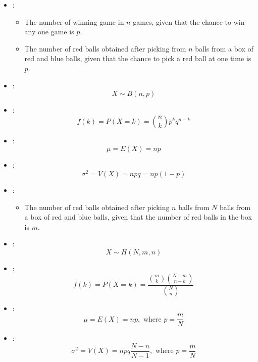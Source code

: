 \begin{multicols}{3}


    \begin{itemize}
      \item {}:
        \begin{itemize}
          \item The number of winning game in $n$ games, given that the chance to win any one game is $p$.
          \item The number of red balls obtained after picking  from $n$ balls from a box of red and blue balls, given that the chance to pick a red ball at one time is $p$.
        \end{itemize}
      \item {}:
        \[
          X \sim B(n, p)
        \]
      \item {}:
        \[
          f(k) = P(X = k) = {n \choose k} p^k q^{n - k}
        \]
      \item {}:
        \[
          \mu = E(X) = np
        \]
      \item {}:
        \[
          \sigma^2 = V(X) = npq = np(1 - p)
        \]
    \end{itemize}

    \begin{itemize}
      \item {}:
        \begin{itemize}
          \item The number of red balls obtained after picking  $n$ balls from $N$ balls from a box of red and blue balls, given that the number of red balls in the box is $m$.
        \end{itemize}
      \item {}:
        \[
          X \sim H(N, m, n)
        \]
      \item {}:
        \[
          f(k) = P(X = k) = \dfrac{{m \choose k} {N - m \choose n - k}}{{N \choose n}}
        \]
      \item {}:
        \[
          \mu = E(X) = np, \text{ where } p = \frac{m}{N}
        \]
      \item {}:
        \[
          \sigma^2 = V(X) = npq \frac{N - n}{N - 1}, \text{ where } p = \frac{m}{N}
        \]
    \end{itemize}


\end{multicols}
